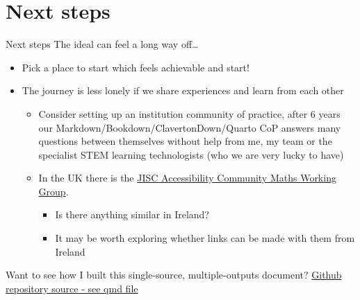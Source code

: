 \documentclass[
  ignorenonframetext,
]{beamer}
\providecommand{\tightlist}{%
  \setlength{\itemsep}{0pt}\setlength{\parskip}{0pt}}
\begin{document}
\section{Next steps}\label{next-steps}

\begin{frame}{Next steps}
The ideal can feel a long way off\ldots{}

\begin{itemize}
\tightlist
\item
  Pick a place to start which feels achievable and start!
\item
  The journey is less lonely if we share experiences and learn from each
  other

  \begin{itemize}
  \tightlist
  \item
    Consider setting up an institution community of practice, after 6
    years our Markdown/Bookdown/ClavertonDown/Quarto CoP answers many
    questions between themselves without help from me, my team or the
    specialist STEM learning technologists (who we are very lucky to
    have)
  \item
    In the UK there is the
    \href{https://sites.google.com/view/accessible-maths/home}{JISC
    Accessibility Community Maths Working Group}.

    \begin{itemize}
    \tightlist
    \item
      Is there anything similar in Ireland?
    \item
      It may be worth exploring whether links can be made with them from
      Ireland
    \end{itemize}
  \end{itemize}
\end{itemize}

Want to see how I built this single-source, multiple-outputs document?
\href{https://github.com/STEM-Enable/Quick-introduction-to-accessible-maths-2026/}{Github
repository source - see qmd file}
\end{frame}
\end{document}
